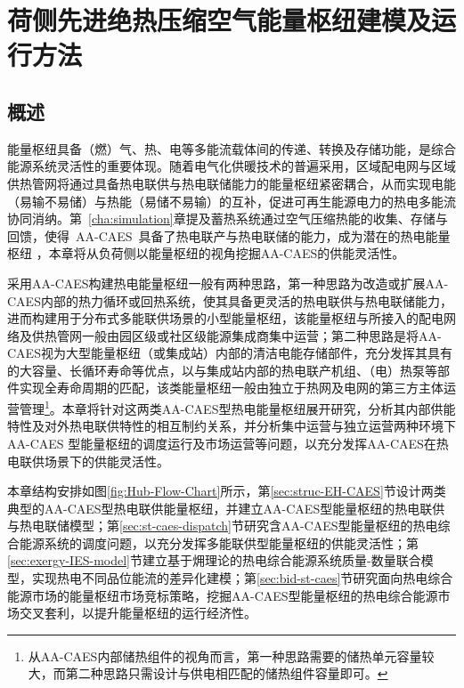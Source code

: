 \chapter{荷侧先进绝热压缩空气能量枢纽建模及运行方法}
\label{cha:st-caes}

\section{概述}
\label{sec:intro}
能量枢纽具备（燃）气、热、电等多能流载体间的传递、转换及存储功能，是综合能源系统灵活性的重要体现。随着电气化供暖技术的普遍采用，区域配电网与区域供热管网将通过具备热电联供与热电联储能力的能量枢纽紧密耦合，从而实现电能（易输不易储）与热能（易储不易输）的互补，促进可再生能源电力的热电多能流协同消纳。第~\ref{cha:simulation}章提及蓄热系统通过空气压缩热能的收集、存储与回馈，使得~AA-CAES~具备了热电联产与热电联储的能力，成为潜在的热电能量枢纽
\cite{EH-Concept-07, EH-FREEDM-11}，本章将从负荷侧以能量枢纽的视角挖掘AA-CAES的供能灵活性。


采用AA-CAES构建热电能量枢纽一般有两种思路，第一种思路为改造或扩展AA-CAES内部的热力循环或回热系统，使其具备更灵活的热电联供与热电联储能力，进而构建用于分布式多能联供场景的小型能量枢纽，该能量枢纽与所接入的配电网络及供热管网一般由园区级或社区级能源集成商集中运营；第二种思路是将AA-CAES视为大型能量枢纽（或集成站）内部的清洁电能存储部件，充分发挥其具有的大容量、长循环寿命等优点，以与集成站内部的热电联产机组、（电）热泵等部件实现全寿命周期的匹配，该类能量枢纽一般由独立于热网及电网的第三方主体运营管理\footnote{从AA-CAES内部储热组件的视角而言，第一种思路需要的储热单元容量较大，而第二种思路只需设计与供电相匹配的储热组件容量即可。}。本章将针对这两类AA-CAES型热电能量枢纽展开研究，分析其内部供能特性及对外热电联供特性的相互制约关系，并分析集中运营与独立运营两种环境下AA-CAES 型能量枢纽的调度运行及市场运营等问题，以充分发挥AA-CAES在热电联供场景下的供能灵活性。

本章结构安排如图\ref{fig:Hub-Flow-Chart}所示，第\ref{sec:struc-EH-CAES}节设计两类典型的AA-CAES型热电联供能量枢纽，并建立AA-CAES型能量枢纽的热电联供与热电联储模型；第\ref{sec:st-caes-dispatch}节研究含AA-CAES型能量枢纽的热电综合能源系统的调度问题，以充分发挥多能联供型能量枢纽的供能灵活性；第
\ref{sec:exergy-IES-model}节建立基于㶲理论的热电综合能源系统质量-数量联合模型，实现热电不同品位能流的差异化建模；第\ref{sec:bid-st-caes}节研究面向热电综合能源市场的能量枢纽市场竞标策略，挖掘AA-CAES型能量枢纽的热电综合能源市场交叉套利，以提升能量枢纽的运行经济性。

